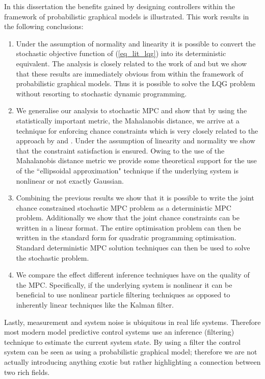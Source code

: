 In this dissertation the benefits gained by designing controllers within the framework of probabilistic graphical models is illustrated. This work results in the following conclusions:
\begin{enumerate}
\item
Under the assumption of normality and linearity it is possible to convert the stochastic objective function of (\ref{eq_lit_lqg}) into its deterministic equivalent. The analysis is closely related to the work of  \cite{yan1} and \cite{yan2} but we show that these results are immediately obvious from within the framework of probabilistic graphical models. Thus it is possible to solve the LQG problem without resorting to stochastic dynamic programming.
\item
We generalise our analysis to stochastic MPC and show that by using the statistically important metric, the Mahalanobis distance, we arrive at a technique for enforcing chance constraints which is very closely related to the approach by \cite{vanhessem2} and \cite{vanhessem1}. Under the assumption of linearity and normality we show that the constraint satisfaction is ensured. Owing to the use of the Mahalanobis distance metric we provide some theoretical support for the use of the ``ellipsoidal approximation" technique if the underlying system is nonlinear or not exactly Gaussian.
\item
Combining the previous results we show that it is possible to write the joint chance constrained stochastic MPC problem as a deterministic MPC problem. Additionally we show that the joint chance constraints can be written in a linear format. The entire optimisation problem can then be written in the standard form for quadratic programming optimisation. Standard deterministic MPC solution techniques can then be used to solve the stochastic problem.
\item
We compare the effect different inference techniques have on the quality of the MPC. Specifically, if the underlying system is nonlinear it can be beneficial to use nonlinear particle filtering techniques as opposed to inherently linear techniques like the Kalman filter.
\end{enumerate}
Lastly, measurement and system noise is ubiquitous in real life systems. Therefore most modern model predictive control systems use an inference (filtering) technique to estimate the current system state. By using a filter the control system can be seen as using a probabilistic graphical model; therefore we are not actually introducing anything exotic but rather highlighting a connection between two rich fields. 

